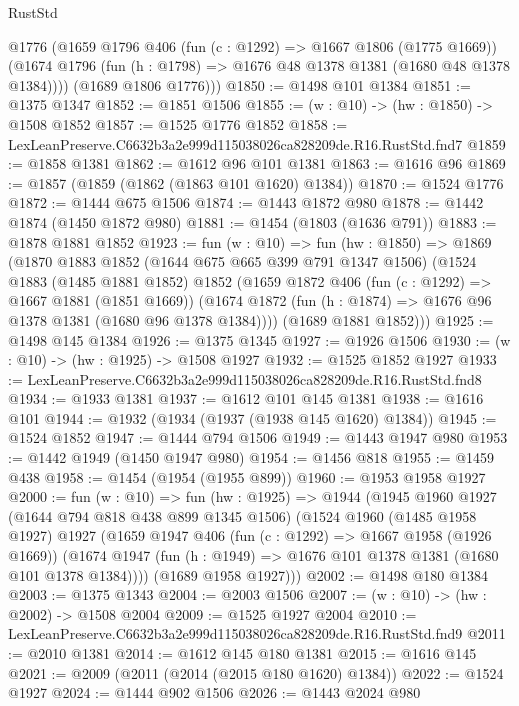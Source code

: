 \begin{lexlean}{RustStd}
\begin{coremodule}
        @1776
        (@1659
          @1796
          @406
          (fun (c : @1292) => @1667 @1806 (@1775 @1669))
          (@1674 @1796 (fun (h : @1798) => @1676 @48 @1378 @1381 (@1680 @48 @1378 @1384))))
        (@1689 @1806 @1776)))
@1850 := @1498 @101 @1384
@1851 := @1375 @1347
@1852 := @1851 @1506
@1855 := (w : @10) -> (hw : @1850) -> @1508 @1852
@1857 := @1525 @1776 @1852
@1858 := LexLeanPreserve.C6632b3a2e999d115038026ca828209de.R16.RustStd.fnd7
@1859 := @1858 @1381
@1862 := @1612 @96 @101 @1381
@1863 := @1616 @96
@1869 := @1857 (@1859 (@1862 (@1863 @101 @1620) @1384))
@1870 := @1524 @1776
@1872 := @1444 @675 @1506
@1874 := @1443 @1872 @980
@1878 := @1442 @1874 (@1450 @1872 @980)
@1881 := @1454 (@1803 (@1636 @791))
@1883 := @1878 @1881 @1852
@1923 := fun (w : @10) =>
  fun (hw : @1850) =>
  @1869
    (@1870
      @1883
      @1852
      (@1644 @675 @665 @399 @791 @1347 @1506)
      (@1524
        @1883
        (@1485 @1881 @1852)
        @1852
        (@1659
          @1872
          @406
          (fun (c : @1292) => @1667 @1881 (@1851 @1669))
          (@1674 @1872 (fun (h : @1874) => @1676 @96 @1378 @1381 (@1680 @96 @1378 @1384))))
        (@1689 @1881 @1852)))
@1925 := @1498 @145 @1384
@1926 := @1375 @1345
@1927 := @1926 @1506
@1930 := (w : @10) -> (hw : @1925) -> @1508 @1927
@1932 := @1525 @1852 @1927
@1933 := LexLeanPreserve.C6632b3a2e999d115038026ca828209de.R16.RustStd.fnd8
@1934 := @1933 @1381
@1937 := @1612 @101 @145 @1381
@1938 := @1616 @101
@1944 := @1932 (@1934 (@1937 (@1938 @145 @1620) @1384))
@1945 := @1524 @1852
@1947 := @1444 @794 @1506
@1949 := @1443 @1947 @980
@1953 := @1442 @1949 (@1450 @1947 @980)
@1954 := @1456 @818
@1955 := @1459 @438
@1958 := @1454 (@1954 (@1955 @899))
@1960 := @1953 @1958 @1927
@2000 := fun (w : @10) =>
  fun (hw : @1925) =>
  @1944
    (@1945
      @1960
      @1927
      (@1644 @794 @818 @438 @899 @1345 @1506)
      (@1524
        @1960
        (@1485 @1958 @1927)
        @1927
        (@1659
          @1947
          @406
          (fun (c : @1292) => @1667 @1958 (@1926 @1669))
          (@1674 @1947 (fun (h : @1949) => @1676 @101 @1378 @1381 (@1680 @101 @1378 @1384))))
        (@1689 @1958 @1927)))
@2002 := @1498 @180 @1384
@2003 := @1375 @1343
@2004 := @2003 @1506
@2007 := (w : @10) -> (hw : @2002) -> @1508 @2004
@2009 := @1525 @1927 @2004
@2010 := LexLeanPreserve.C6632b3a2e999d115038026ca828209de.R16.RustStd.fnd9
@2011 := @2010 @1381
@2014 := @1612 @145 @180 @1381
@2015 := @1616 @145
@2021 := @2009 (@2011 (@2014 (@2015 @180 @1620) @1384))
@2022 := @1524 @1927
@2024 := @1444 @902 @1506
@2026 := @1443 @2024 @980

\end{coremodule}
\end{lexlean}
